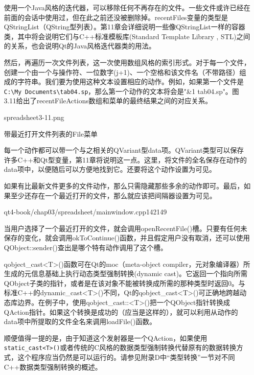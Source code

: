\documentclass[11pt,oneside]{book}
\begin{document}
\begin{common-format}
使用一个Java风格的迭代器，可以移除任何不再存在的文件。一些文件或许已经在前面的会话中使用过，但在此之前还没被删除掉。recentFiles变量的类型是QStringList（QString型列表）。第11章会详细说明一些像QStringList一样的容器类，其中将会说明它们与C++标准模板库(Standard Template Library , STL)之间的关系，也会说明Qt的Java风格迭代器类的用法。

然后，再遍历一次文件列表，这一次使用数组风格的索引形式。对于每一个文件，创建一个由一个与操作符、一位数字(j+1)、一个空格和该文件名（不带路径）组成的字符串。我们要为使用这种文本设置相应的动作。例如，如果第一个文件是\verb+C:\My Documents\tab04.sp+，那么第一个动作的文本将会是"\&{}1 tab04.sp"。图3.11给出了recentFileActions数组和菜单的最终结果之间的对应关系。

\begin{linefig}[0.8]{spreadsheet3-11.png}
\caption{带最近打开文件列表的File菜单}
\label{fig:spreadsheet3-11.png}
\end{linefig}

每一个动作都可以带一个与之相关的QVariant型data项。QVariant类型可以保存许多C++和Qt型变量，第11章将说明这一点。这里，将文件的全名保存在动作的data项中，以便随后可以方便地找到它。还要将这个动作设置为可见。 

如果有比最新文件更多的文件动作，那么只需隐藏那些多余的动作即可。最后，如果至少还存在一个最近打开的文件，那么就应该把间隔器设置为可见。
\begin{cppline}{qt4-book/chap03/spreadsheet/mainwindow.cpp}{142}{149}
\end{cppline}

当用户选择了一个最近打开的文件，就会调用openRecentFile()槽。只要有任何未保存的变化，就会调用okToContinue()函数，并且假定用户没有取消，还可以使用QObject::sender()查出是哪个特有动作调用了这个槽。   

qobject\_{}cast<T>()函数可在Qt的moc（meta-object compiler，元对象编译器）所生成的元信息基础上执行动态类型强制转换(dynamic cast)。它返回一个指向所需QObject子类的指针，或者是在该对象不能被转换成所需的那种类型时返回0。与标准C++的dynamic\_{}cast<T>()不同，Qt的qobject\_{}cast<T>()可正确地跨越动态库边界。在例子中，使用qobject\_{}cast::<T>()把一个QObject指针转换成QAction指针。如果这个转换是成功的（应当是这样的），就可以利用从动作的data项中所提取的文件全名来调用loadFile()函数。

顺便值得一提的是，由于知道这个发射器是一个QAction，如果使用\\ \verb+static_cast<T>()+或者传统的C风格的数据类型强制转换代替原有的数据转换方式，这个程序应当仍然是可以运行的。请参见附录D中“类型转换”一节对不同C++数据类型强制转换的概述。



\end{common-format}
\end{document}
